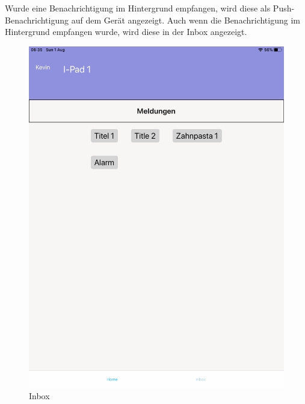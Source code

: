 Wurde eine Benachrichtigung im Hintergrund empfangen, wird diese als Push-Benachrichtigung auf dem Gerät angezeigt.
Auch wenn die Benachrichtigung im Hintergrund empfangen wurde, wird diese in der Inbox angezeigt.

\begin{figure}[h]
    \centering
    \begin{minipage}[b]{0.4\textwidth}
        \includegraphics[width=\textwidth]{graphics/screenshots/mobileclient/screenshot-homescreen}
        \caption{Inbox}
    \end{minipage}
    \hfill
    \begin{minipage}[b]{0.4\textwidth}

\end{minipage}
\end{figure}
